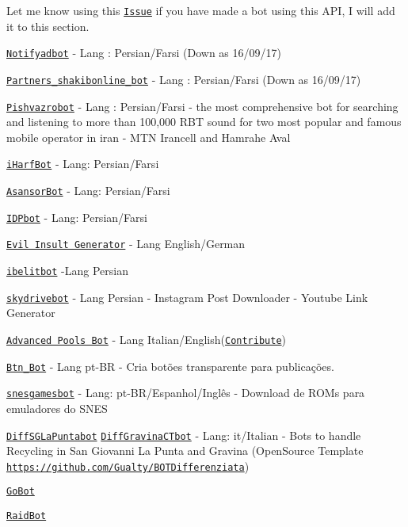 Let me know using this \href{https://github.com/Eleirbag89/TelegramBotPHP/issues/80}{\tt Issue} if you have made a bot using this A\-P\-I, I will add it to this section.
\begin{DoxyItemize}
\item \href{https://telegram.me/notifyadbot}{\tt Notifyadbot} -\/ Lang \-: Persian/\-Farsi (Down as 16/09/17)
\item \href{https://telegram.me/Partners_shakibonline_bot}{\tt Partners\-\_\-shakibonline\-\_\-bot} -\/ Lang \-: Persian/\-Farsi (Down as 16/09/17)
\item \href{https://t.me/pishvazrobot}{\tt Pishvazrobot} -\/ Lang \-: Persian/\-Farsi -\/ the most comprehensive bot for searching and listening to more than 100,000 R\-B\-T sound for two most popular and famous mobile operator in iran -\/ M\-T\-N Irancell and Hamrahe Aval
\item \href{https://t.me/iHarfBot}{\tt i\-Harf\-Bot} -\/ Lang\-: Persian/\-Farsi
\item \href{https://t.me/AsansorBot}{\tt Asansor\-Bot} -\/ Lang\-: Persian/\-Farsi
\item \href{https://t.me/IDPbot}{\tt I\-D\-Pbot} -\/ Lang\-: Persian/\-Farsi
\item \href{https://telegram.me/EvilInsultGeneratorBot}{\tt Evil Insult Generator} -\/ Lang English/\-German
\item \href{https://telegram.me/ibelitbot}{\tt ibelitbot} -\/\-Lang Persian
\item \href{https://telegram.me/skydrivebot}{\tt skydrivebot} -\/ Lang Persian -\/ Instagram Post Downloader -\/ Youtube Link Generator
\item \href{https://telegram.me/apollbot}{\tt Advanced Pools Bot} -\/ Lang Italian/\-English(\href{https://poeditor.com/join/project/NMAUjrAZ5f}{\tt Contribute})
\item \href{https://telegram.me/Btn_Bot}{\tt Btn\-\_\-\-Bot} -\/ Lang pt-\/\-B\-R -\/ Cria botões transparente para publicações.
\item \href{https://telegram.me/snesgamesbot}{\tt snesgamesbot} -\/ Lang\-: pt-\/\-B\-R/\-Espanhol/\-Inglês -\/ Download de R\-O\-Ms para emuladores do S\-N\-E\-S
\item \href{https://telegram.me/DiffSGLaPuntabot}{\tt Diff\-S\-G\-La\-Puntabot} \href{https://telegram.me/DiffGravinaCTbot}{\tt Diff\-Gravina\-C\-Tbot} -\/ Lang\-: it/\-Italian -\/ Bots to handle Recycling in San Giovanni La Punta and Gravina (Open\-Source Template \href{https://github.com/Gualty/BOTDifferenziata}{\tt https\-://github.\-com/\-Gualty/\-B\-O\-T\-Differenziata})
\item \href{https://t.me/CoReYe_PGO_bot}{\tt Go\-Bot}
\item \href{https://t.me/CoReYe_PGO_Raid_bot}{\tt Raid\-Bot}
\end{DoxyItemize}

